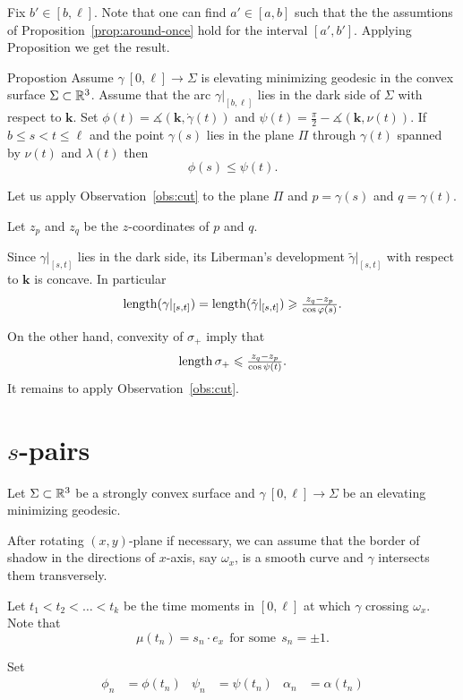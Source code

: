 \documentclass[a4paper,10pt]{amsart}
\begin{document}
Fix $b'\in [b,\ell]$.
Note that one can find $a'\in [a,b]$ such that the the assumtions of Proposition~\ref{prop:around-once} hold for the interval $[a',b']$. Applying Proposition we get the result.\qeds 


\begin{thm}{Propostion}\label{prop:phi-psi}
Assume $\gamma\:[0,\ell]\to \Sigma$ is elevating minimizing geodesic in the convex surface $\Sigma\subset \mathbb{R}^3$.
Assume that the arc $\gamma|_{[b,\ell]}$ lies in the dark side of $\Sigma$ with respect to $\bm{k}$.
Set $\phi(t)=\measuredangle(\bm{k},\dot\gamma(t))$ and $\psi(t)=\tfrac\pi2-\measuredangle(\bm{k},\nu(t))$.
If $b\le s<t\le \ell$ and the point $\gamma(s)$ lies in the plane $\Pi$ through $\gamma(t)$ spanned by $\nu(t)$ and $\lambda(t)$
then 
\[\phi(s)\le \psi(t).\]
\end{thm}

Let us apply Observation~\ref{obs:cut} to the plane $\Pi$ and $p=\gamma(s)$ and $q=\gamma(t)$.

Let $z_p$ and $z_q$ be the $z$-coordinates of $p$ and $q$.

Since $\gamma|_{[s,t]}$ lies in the dark side,
its Liberman's development $\tilde\gamma|_{[s,t]}$ 
with respect to $\bm{k}$ is concave.
In particular 
\[\mathop{\rm length}\nolimits(\gamma|_{[s,t]})
=
\mathop{\rm length}\nolimits(\tilde\gamma|_{[s,t]})
\geqslant
\tfrac{z_q-z_p}{\cos\varphi(s)}.\]

On the other hand, convexity of $\sigma_+$ imply that
\[\mathop{\rm length}\nolimits\sigma_+\leqslant \tfrac{z_q-z_p}{\cos\psi(t)}.\]
It remains to apply Observation~\ref{obs:cut}.
\qeds

\section{$s$-pairs}

Let $\Sigma\subset \mathbb{R}^3$ 
be a strongly convex surface
and $\gamma\:[0,\ell]\to\Sigma$ be an elevating minimizing geodesic.

After rotating $(x,y)$-plane if necessary, 
we can assume that the border of shadow in the directions of $x$-axis, say $\omega_x$, 
is a smooth curve and $\gamma$ intersects them transversely.

Let $t_1<t_2<\dots<t_k$ be the time moments in $[0,\ell]$ 
at which $\gamma$ crossing $\omega_x$.
Note that 
\[\mu(t_n)=s_n\cdot e_x\ \ \text{for some}\ \  s_n=\pm1.\]

Set
\begin{align*}
\phi_n&=\phi(t_n)
&
\psi_n&=\psi(t_n)
&
\alpha_n&=\alpha(t_n)
\end{align*}
\end{document}

